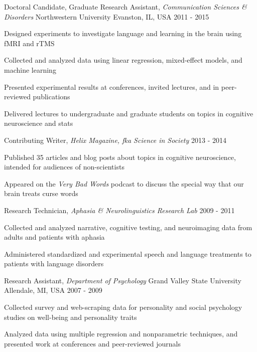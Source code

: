 \begin{cventries}
 \cventry
    {Doctoral Candidate, Graduate Research Assistant, \textit{Communication Sciences \& Disorders}} %
    {Northwestern University} %
    {Evanston, IL, USA} %
    {2011 - 2015} %
   {
    \begin{cvitems}
    \item {Designed experiments to investigate language and learning in the brain using fMRI and rTMS}
    \item {Collected and analyzed data using linear regression, mixed-effect models, and machine learning}
    \item {Presented experimental results at conferences, invited lectures, and in peer-reviewed publications} 
    \item {Delivered lectures to undergraduate and graduate students on topics in cognitive neuroscience and stats} 
    \end{cvitems}
    }
    
   \cventry
    {Contributing Writer, \textit{Helix Magazine, fka Science in Society}}
    {}
    {}
    {2013 - 2014}
    {
      \begin{cvitems}
      \item {Published 35 articles and blog posts about topics in cognitive neuroscience, intended for audiences of non-scientists}
      \item {Appeared on the \textit{Very Bad Words} podcast to discuss the special way that our brain treats curse words}
      \end{cvitems}
    }

  \cventry
    {Research Technician, \textit{Aphasia \& Neurolinguistics Research Lab}} %
    {} %
    {} %
    {2009 - 2011} %
    {
      \begin{cvitems} %
        \item {Collected and analyzed narrative, cognitive testing, and neuroimaging data from adults and patients with aphasia}
        \item {Administered standardized and experimental speech and language treatments to patients with language disorders}
      \end{cvitems}
    }

  \cventry
    {Research Assistant, \textit{Department of Psychology}} %
    {Grand Valley State University} %
    {Allendale, MI, USA} %
    {2007 - 2009} %
    {
      \begin{cvitems} %
        \item {Collected survey and web-scraping data for personality and social psychology studies on well-being and personality traits}
        \item {Analyzed data using multiple regression and nonparametric techniques, and presented work at conferences and peer-reviewed journals}
      \end{cvitems}
    }

\end{cventries}
